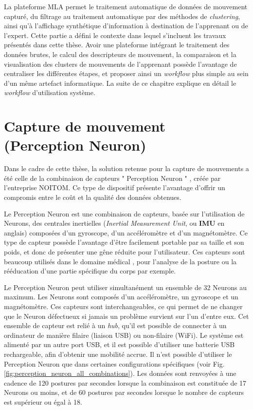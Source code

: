 La plateforme MLA permet le traitement automatique de données de mouvement capturé, du filtrage au traitement automatique par des méthodes de \textit{clustering}, ainsi qu'à l'affichage synthétique d'information à destination de l'apprenant ou de l'expert. Cette partie a défini le contexte dans lequel s'incluent les travaux présentés dans cette thèse. Avoir une plateforme intégrant le traitement des données brutes, le calcul des descripteurs de mouvement, la comparaison et la visualisation des clusters de mouvements de l’apprenant possède l'avantage de centraliser les différentes étapes, et proposer ainsi un \textit{workflow} plus simple au sein d'un même artefact informatique. La suite de ce chapitre explique en détail le \textit{workflow} d'utilisation système.

\section{Capture de mouvement (Perception Neuron)}
Dans le cadre de cette thèse, la solution retenue pour la capture de mouvements a été celle de la combinaison de capteurs " Perception Neuron " \parencite{perceptionNeuron}, créée par l'entreprise NOITOM. Ce type de dispositif présente l'avantage d'offrir un compromis entre le coût et la qualité des données obtenues.

Le Perception Neuron est une combinaison de capteurs, basée sur l'utilisation de Neurons, des centrales inertielles (\textit{Inertial Measurement Unit}, ou \textbf{IMU} en anglais) composées d'un gyroscope, d'un accéléromètre et d'un magnétomètre. Ce type de capteur possède l'avantage d'être facilement portable par sa taille et son poids, et donc de présenter une gêne réduite pour l'utilisateur. Ces capteurs sont beaucoup utilisés dans le domaine médical \parencite{PORCIUNCULA2018S220}, pour l'analyse de la posture ou la rééducation d'une partie spécifique du corps par exemple.

Le Perception Neuron peut utiliser simultanément un ensemble de 32 Neurons au maximum. Les Neurons sont composés d'un accéléromètre, un gyroscope et un magnétomètre. Ces capteurs sont interchangeables, ce qui permet de ne changer que le Neuron défectueux si jamais un problème survient sur l'un d'entre eux. Cet ensemble de capteur est relié à un \textit{hub}, qu'il est possible de connecter à un ordinateur de manière filaire (liaison USB) ou non-filaire (WiFi). Le système est alimenté par un autre port USB, et il est possible d'utiliser une batterie USB rechargeable, afin d'obtenir une mobilité accrue. Il n'est possible d'utiliser le Perception Neuron que dans certaines configurations spécifiques (voir Fig. \ref{fig:perception_neuron_all_combinations}). Les données sont renvoyées à une cadence de 120 postures par secondes lorsque la combinaison est constituée de 17 Neurons ou moins, et de 60 postures par secondes lorsque le nombre de capteurs est supérieur ou égal à 18.

